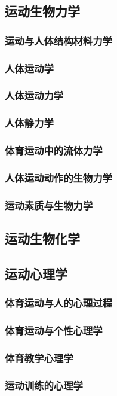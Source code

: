 \documentclass[UTF8]{../../ApplicationUniverse}
\begin{document}
    \subsection{运动生物力学}
        \subsubsection{运动与人体结构材料力学}
        \subsubsection{人体运动学}
        \subsubsection{人体运动力学}
        \subsubsection{人体静力学}
        \subsubsection{体育运动中的流体力学}
        \subsubsection{人体运动动作的生物力学}
        \subsubsection{运动素质与生物力学}
    \subsection{运动生物化学}
    \subsection{运动心理学}
        \subsubsection{体育运动与人的心理过程}
        \subsubsection{体育运动与个性心理学}
        \subsubsection{体育教学心理学}
        \subsubsection{运动训练的心理学}
\end{document}
